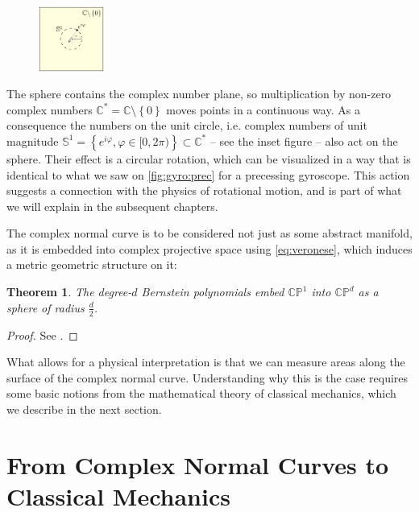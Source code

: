 \documentclass[final,3p,mathptmx]{elsarticle}
\newtheorem{theorem}{Theorem}
\begin{document}
\begingroup
\setlength{\columnsep}{6pt}
\setlength{\intextsep}{0pt}
\begin{figure}
	\includegraphics[width=0.19\textwidth, keepaspectratio]{figures/cylinder.pdf}
	\label{fig:cylinder}
\end{figure}
The sphere contains the complex number plane, so multiplication by non-zero complex numbers $\mathbb{C}^{\ast} = \mathbb{C} \setminus \left\lbrace 0\right\rbrace$ moves points in a continuous way. As a consequence the numbers on the unit circle, i.e. complex numbers of unit magnitude $\mathbb{S}^{1} = \left\lbrace e^{i\varphi}, \varphi \in [0,2\pi) \right\rbrace \subset \mathbb{C}^{\ast}$ -- see the inset figure -- also act on the sphere. Their effect is a circular rotation, which can be visualized in a way that is identical to what we saw on \autoref{fig:gyro:prec} for a precessing gyroscope. This action suggests a connection with the physics of rotational motion, and is part of what we will explain in the subsequent chapters.

\endgroup
The complex normal curve is to be considered not just as some abstract manifold, as it is embedded into complex projective space using \eqref{eq:veronese}, which induces a metric geometric structure on it:
\begin{theorem}\label{thm:round}
	The degree-$d$ Bernstein polynomials embed $\mathbb{CP}^{1}$ into $\mathbb{CP}^d $ as a sphere of radius $\frac{d}{2}$.
\end{theorem}
\begin{proof}
	See \cite[Ch. 6.3]{bengtsson2006geometry}.
\end{proof}
What allows for a physical interpretation is that we can measure areas along the surface of the complex normal curve. Understanding why this is the case requires some basic notions from the mathematical theory of classical mechanics, which we describe in the next section.

\section{From Complex Normal Curves to Classical Mechanics}\label{sec:classicalbasics}
\end{document}
